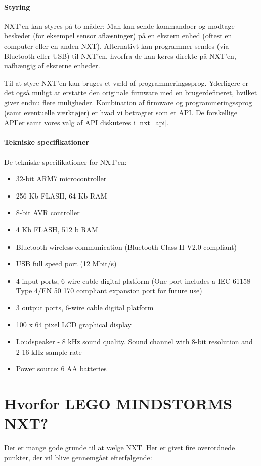 \paragraph{Styring}
NXT'en kan styres på to måder:
Man kan sende kommandoer og modtage beskeder (for eksempel sensor aflæsninger) på en ekstern enhed (oftest en computer eller en anden NXT).
Alternativt kan programmer sendes (via Bluetooth eller USB) til NXT'en, hvorfra de kan køres direkte på NXT'en, uafhængig af eksterne enheder.

Til at styre NXT'en kan bruges et væld af programmeringssprog.
Yderligere er det også muligt at erstatte den originale firmware med en brugerdefineret, hvilket giver endnu flere muligheder.
Kombination af firmware og programmeringssprog (samt eventuelle værktøjer) er hvad vi betragter som et API.
De forskellige API'er samt vores valg af API diskuteres i \cref{nxt_api}.

\paragraph{Tekniske specifikationer}
De tekniske specifikationer for NXT'en:\cite{nxt}
\begin{itemize}
\item{32-bit ARM7 microcontroller}
\item{256 Kb FLASH, 64 Kb RAM}
\item{8-bit AVR controller}
\item{4 Kb FLASH, 512 b RAM}
\item{Bluetooth wireless communication (Bluetooth Class II V2.0 compliant)}
\item{USB full speed port (12 Mbit/s)}
\item{4 input ports, 6-wire cable digital platform (One port includes a IEC 61158 Type 4/EN 50 170 compliant expansion port for future use)}
\item{3 output ports, 6-wire cable digital platform}
\item{100 x 64 pixel LCD graphical display}
\item{Loudspeaker - 8 kHz sound quality. Sound channel with 8-bit resolution and 2-16 kHz sample rate}
\item{Power source: 6 AA batteries}
\end{itemize}

\section{Hvorfor LEGO MINDSTORMS NXT?}
Der er mange gode grunde til at vælge \legoms NXT.
Her er givet fire overordnede punkter, der vil blive gennemgået efterfølgende:

